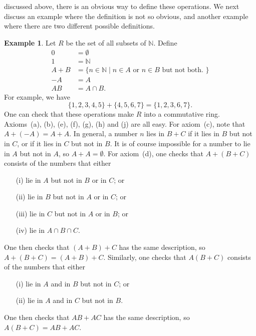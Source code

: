 \documentclass{amsart}
\newcommand{\st}        {\;|\;}
\newcommand{\N}         {{\mathbb{N}}}
\renewcommand{\:}{\colon}
\theoremstyle{definition}
\newtheorem{example}[theorem]{Example}
\begin{document}
discussed above, there is an obvious way to define these operations.
We next discuss an example where the definition is not so obvious, and
another example where there are two different possible definitions. 
\begin{example}\label{eg-subsets}
 Let $R$ be the set of all subsets of $\N$.  Define
 \begin{align*}
  0 &= \emptyset \\
  1 &= \N \\
  A+B &= \{ n\in\N \st n\in A \text{ or } n \in B 
                  \text{ but not both. } \} \\
  -A &= A \\
  AB &= A\cap B.
 \end{align*}
 For example, we have
 \[ \{1,2,3,4,5\} + \{4,5,6,7\} = \{1,2,3,6,7\}. \]
 One can check that these operations make $R$ into a commutative ring.
 Axioms~(a), (b), (e), (f), (g), (h) and (j) are all easy.  For
 axiom~(c), note that $A+(-A)=A+A$.  In general, a number $n$ lies in
 $B+C$ if it lies in $B$ but not in $C$, or if it lies in $C$ but not
 in $B$.  It is of course impossible for a number to lie in $A$ but
 not in $A$, so $A+A=\emptyset$.  For axiom~(d), one checks that 
 $A+(B+C)$ consists of the numbers that either 
 \begin{itemize}
 \item[(i)] lie in $A$ but not in $B$ or in $C$; or
 \item[(ii)] lie in $B$ but not in $A$ or in $C$; or
 \item[(iii)] lie in $C$ but not in $A$ or in $B$; or
 \item[(iv)] lie in $A\cap B\cap C$.
 \end{itemize}
 One then checks that $(A+B)+C$ has the same description, so
 $A+(B+C)=(A+B)+C$.  Similarly, one checks that $A(B+C)$ consists of
 the numbers that either
 \begin{itemize}
 \item[(i)] lie in $A$ and in $B$ but not in $C$; or
 \item[(ii)] lie in $A$ and in $C$ but not in $B$.
 \end{itemize}
 One then checks that $AB+AC$ has the same description, so
 $A(B+C)=AB+AC$. 
\end{example}
\end{document}

